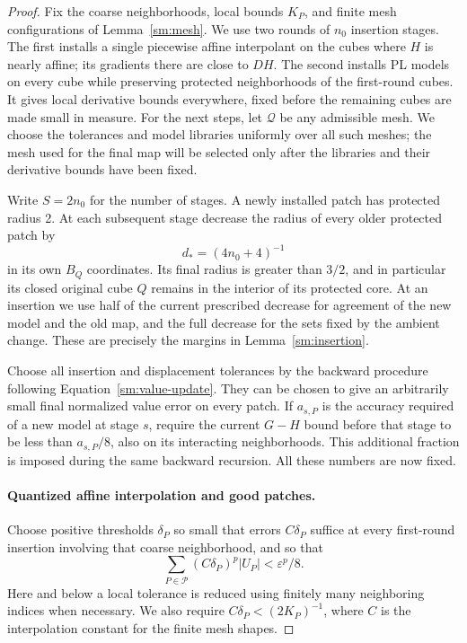 \documentclass[11pt]{article}
\numberwithin{equation}{section}
\theoremstyle{definition}
\theoremstyle{remark}
\begin{document}
\begin{proof}
Fix the coarse neighborhoods, local bounds $K_P$, and finite
mesh configurations of Lemma~\ref{sm:mesh}.  We use two rounds of
$n_0$ insertion stages.  The first installs a single piecewise
affine interpolant on the cubes where $H$ is nearly affine; its
gradients there are close to $DH$.  The second installs PL models
on every cube while preserving protected neighborhoods of the
first-round cubes.  It gives
local derivative bounds everywhere, fixed before the remaining
cubes are made small in measure.  For the next steps, let
$\mathcal Q$ be any admissible mesh.  We choose the tolerances
and model libraries uniformly over all such meshes; the mesh
used for the final map will be selected only after the libraries
and their derivative bounds have been fixed.

Write $S=2n_0$ for the number of stages.  A newly installed patch
has protected radius 2.  At each subsequent stage decrease
the radius of every older protected patch by
\begin{equation}
 \label{sm:shrink-size}
 d_*=(4n_0+4)^{-1}
\end{equation}
in its own $B_Q$ coordinates.  Its final radius is greater
than $3/2$, and in particular its closed original cube $Q$
remains in the interior of its protected core.  At an
insertion we use half of the current prescribed decrease
for agreement of the new model and the old map, and the
full decrease for the sets fixed by the ambient change.
These are precisely the margins in
Lemma~\ref{sm:insertion}.

Choose all insertion and displacement tolerances by the
backward procedure following Equation~\eqref{sm:value-update}.
They can be chosen to give an arbitrarily small final
normalized value error on every patch.  If $a_{s,P}$ is
the accuracy required of a new model at stage $s$, require
the current $G-H$ bound before that stage to be less than
$a_{s,P}/8$, also on its interacting neighborhoods.  This
additional fraction is imposed during the same backward
recursion.  All these numbers are now fixed.

\paragraph{Quantized affine interpolation and good patches.}
Choose positive thresholds $\delta_P$ so small that errors
$C\delta_P$ suffice at every first-round insertion involving
that coarse neighborhood, and so that
\begin{equation}
 \label{sm:good-error-budget}
 \sum_{P\in\mathcal P}(C\delta_P)^p |U_P|<\varepsilon^p/8.
\end{equation}
Here and below a local tolerance is reduced using finitely many
neighboring indices when necessary.  We also require
$C\delta_P<(2K_P)^{-1}$, where $C$ is the interpolation
constant for the finite mesh shapes.


\end{proof}
\end{document}
